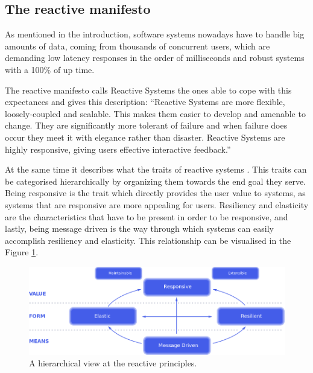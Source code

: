 \documentclass[../main.tex]{subfiles}
\begin{document}
\subsection{The reactive manifesto}

As mentioned in the introduction, software systems nowadays have to handle big amounts of data,
coming from thousands of concurrent users, which are demanding low latency responses in the order of
milliseconds and robust systems with a 100\% of up time.


The reactive manifesto \autocite{2014TheManifesto} calls Reactive Systems the
ones able to cope with this expectances and gives this description: ``Reactive
Systems are more flexible, loosely-coupled and scalable. This makes them easier
to develop and amenable to change. They are significantly more tolerant of
failure and when failure does occur they meet it with elegance rather than
disaster. Reactive Systems are highly responsive, giving users effective
interactive feedback.''


At the same time it describes what the traits of reactive systems . This
traits can be categorised hierarchically by organizing them towards the end goal they serve. Being
responsive is the trait which directly provides the user value to systems, as systems that are responsive
are more appealing for users. Resiliency and elasticity are the characteristics that
have to be present in order to be responsive, and lastly, being message driven is the way
through which systems can easily accomplish resiliency and elasticity. This relationship can be visualised in the Figure
\ref{fig:reactive}.

\begin{figure}[ht] \centering
\includegraphics[width=\textwidth]{images/reactive-traits.png}
    \caption{A hierarchical view at the reactive principles.}
    \label{fig:reactive}
\end{figure}
\end{document}
